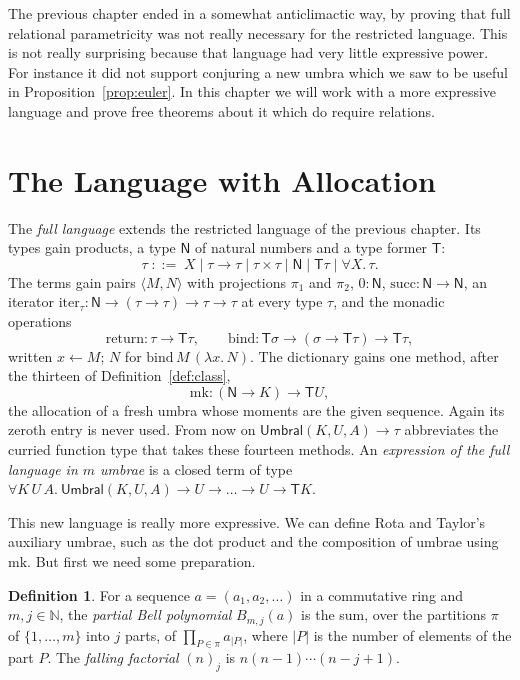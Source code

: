 \documentclass[11pt,a4paper]{report}
\theoremstyle{plain}
\theoremstyle{definition}
\newtheorem{definition}[theorem]{Definition}
\theoremstyle{remark}
\newcommand{\Umbral}{\mathsf{Umbral}}
\newcommand{\NN}{\mathbb{N}}
\newcommand{\T}{\mathsf{T}}
\newcommand{\Nat}{\mathsf{N}}
\newcommand{\mk}{\mathrm{mk}}
\begin{document}
The previous chapter ended in a somewhat anticlimactic way, by proving that
full relational parametricity was not really necessary for the restricted language. This is 
not really surprising because that language had very little expressive power. For instance
it did not support conjuring a new umbra which we saw to be useful in Proposition~\ref{prop:euler}.
In this chapter we will work with a more expressive language and prove free theorems about it which do 
require relations.


\section{The Language with Allocation}
\label{sec:alloc-language}

The \emph{full language} extends the restricted language of the previous chapter. Its types gain 
products, a type $\Nat$ of natural numbers and a type former $\T$:
\[
  \tau \;::=\; X \mid \tau \to \tau \mid \tau \times \tau \mid \Nat \mid \T\tau
    \mid \forall X.\, \tau .
\]
The terms gain pairs $\langle M, N \rangle$ with projections $\pi_1$ and $\pi_2$,
$0 : \Nat$, $\mathrm{succ} : \Nat \to \Nat$, an iterator
$\mathrm{iter}_\tau : \Nat \to (\tau \to \tau) \to \tau \to \tau$ at every type
$\tau$, and the monadic operations
\[
  \mathrm{return} : \tau \to \T\tau ,
  \qquad
  \mathrm{bind} : \T\sigma \to (\sigma \to \T\tau) \to \T\tau ,
\]
written $x \leftarrow M;\, N$ for $\mathrm{bind}\, M\, (\lambda x.\, N)$. The
dictionary gains one method, after the thirteen of Definition~\ref{def:class},
\[
  \mk : (\Nat \to K) \to \T U ,
\]
the allocation of a fresh umbra whose moments are the given sequence. Again its
zeroth entry is never used. From now on $\Umbral(K, U, A) \to \tau$ abbreviates
the curried function type that takes these fourteen methods. An 
\emph{expression of the full language in $m$ umbrae} is a closed term of type
$\forall K\,U\,A.\ \Umbral(K, U, A) \to U \to \dots \to U \to \T K$.

This new language is really more expressive. We can define Rota and Taylor's auxiliary umbrae, 
such as the dot product and the composition of umbrae using $\mk$. But first we need 
some preparation.

\begin{definition}
\label{def:bell}
For a sequence $a = (a_1, a_2, \dots)$ in a commutative ring and $m, j \in \NN$,
the \emph{partial Bell polynomial} $B_{m,j}(a)$ is the sum, over the partitions
$\pi$ of $\{1, \dots, m\}$ into $j$ parts, of $\prod_{P \in \pi} a_{|P|}$, where
$|P|$ is the number of elements of the part $P$.
The \emph{falling factorial} $(n)_j$ is $n(n-1)\cdots(n-j+1)$.
\end{definition}
\end{document}
